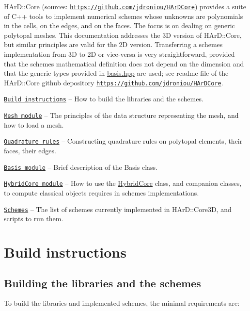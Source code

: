 H\+Ar\+D\+::\+Core (sources\+: \href{https://github.com/jdroniou/HArDCore}{\tt https\+://github.\+com/jdroniou/\+H\+Ar\+D\+Core}) provides a suite of C++ tools to implement numerical schemes whose unknowns are polynomials in the cells, on the edges, and on the faces. The focus is on dealing on generic polytopal meshes. This documentation addresses the 3D version of H\+Ar\+D\+::\+Core, but similar principles are valid for the 2D version. Transferring a scheme\textquotesingle{}s implementation from 3D to 2D or vice-\/versa is very straightforward, provided that the scheme\textquotesingle{}s mathematical definition does not depend on the dimension and that the generic types provided in {\ttfamily \hyperlink{basis_8hpp_source}{basis.\+hpp}} are used; see readme file of the H\+Ar\+D\+::\+Core github depository \href{https://github.com/jdroniou/HArDCore}{\tt https\+://github.\+com/jdroniou/\+H\+Ar\+D\+Core}.


\begin{DoxyItemize}
\item \href{#build}{\tt Build instructions} -- How to build the libraries and the schemes.
\item \href{#mesh}{\tt Mesh module} -- The principles of the data structure representing the mesh, and how to load a mesh.
\item \href{#quad_rules}{\tt Quadrature rules} -- Constructing quadrature rules on polytopal elements, their faces, their edges.
\item \href{#basis}{\tt Basis module} -- Brief description of the Basis class.
\item \href{#hybridcore}{\tt Hybrid\+Core module} -- How to use the \hyperlink{classHArDCore3D_1_1HybridCore}{Hybrid\+Core} class, and companion classes, to compute classical objects requires in schemes\textquotesingle{} implementations.
\item \href{#schemes}{\tt Schemes} -- The list of schemes currently implemented in H\+Ar\+D\+::\+Core3D, and scripts to run them.
\end{DoxyItemize}

\label{_build}%
 \hypertarget{index_build}{}\section{Build instructions}\label{index_build}
\hypertarget{index_buildlib}{}\subsection{Building the libraries and the schemes}\label{index_buildlib}
To build the libraries and implemented schemes, the minimal requirements are\+:


